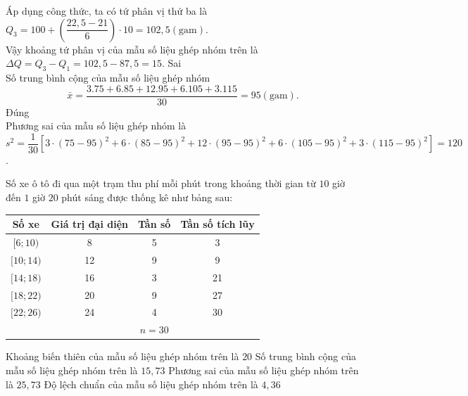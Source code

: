 \begin{ex}
{\begin{itemchoice}
			Áp dụng công thức, ta có tứ phân vị thứ ba là $Q_3=100+\left(\dfrac{22,5-21}{6}\right) \cdot 10=102,5(\mathrm{gam})$.\\
			Vậy khoảng tứ phân vị của mẫu số liệu ghép nhóm trên là $\Delta Q=Q_3-Q_1=102,5-87,5=15$.	
			\itemch Sai\\
			Số trung bình cộng của mẫu số liệu ghép nhóm
			$$
			\bar{x}=\dfrac{3.75+6.85+12.95+6.105+3.115}{30}=95(\mathrm{gam}).
			$$
			\itemch Đúng\\
			Phương sai của mẫu số liệu ghép nhóm là
			$$
			s^2=\dfrac{1}{30}\left[3 \cdot(75-95)^2+6 \cdot(85-95)^2+12 \cdot(95-95)^2+6 \cdot(105-95)^2+3 \cdot(115-95)^2\right]=120
			$$.
		\end{itemchoice}
	}
\end{ex}

\begin{ex}%
	Số xe ô tô đi qua một trạm thu phí mỗi phút trong khoảng thời gian từ $10$ giờ đến $1$ giờ $20$ phút sáng được thống kê như bảng sau:
	\begin{center}
		\begin{tabular}{|c|c|c|c|}
			\hline Số xe & Giá trị đại diện & Tần số & Tần số tích lũy \\
			\hline$[6 ; 10)$ & 8 & 5 & 3 \\
			\hline$[10 ; 14)$ & 12 & 9 & 9 \\
			\hline$[14 ; 18)$ & 16 & 3 & 21 \\
			\hline$[18 ; 22)$ & 20 & 9 & 27 \\
			\hline$[22 ; 26)$ & 24 & 4 & 30 \\
			\hline & & $n=30$ & \\
			\hline	
		\end{tabular}
	\end{center}
	\choiceTF
	{\True Khoảng biến thiên của mẫu số liệu ghép nhóm trên là $20$}
	{\True Số trung bình cộng của mẫu số liệu ghép nhóm trên là $15{,}73$}
	{Phương sai của mẫu số liệu ghép nhóm trên là $25{,}73$}
	{Độ lệch chuẩn của mẫu số liệu ghép nhóm trên là $4{,}36$}
\end{ex}

